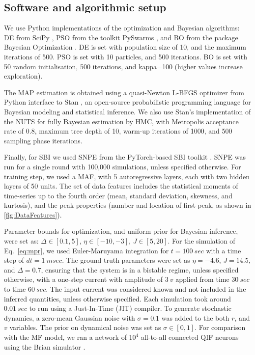 \documentclass[12pt]{article}
\begin{document}
\subsection{Software and algorithmic setup} 

We use Python implementations of the optimization and Bayesian algorithms: DE from SciPy \citep{Virtanen2020scipy}, PSO from the toolkit PySwarms \citep{Miranda2018pyswarms}, and BO from the package Bayesian Optimization \citep{Nogueira2014BO}. DE is set with population size of 10, and the maximum iterations of 500. PSO is set with 10 particles, and 500 iterations. BO is set with 50 random initialisation, 500 iterations, and kappa=100 (higher values increase exploration).

The MAP estimation is obtained using a quasi-Newton L-BFGS optimizer from Python interface to Stan \citep{Carpenter2017}, an open-source probabilistic programming language for Bayesian modeling and statistical inference. We also use Stan's implementation of the NUTS for fully Bayesian estimation by HMC, with Metropolis acceptance rate of 0.8, maximum tree depth of 10, warm-up iterations of 1000, and 500 sampling phase iterations. 

Finally, for SBI we used SNPE from the PyTorch-based SBI toolkit \citep{Tejero2020sbi}. SNPE was run for a single round with 100,000 simulations, unless specified otherwise. For training step, we used a MAF, with 5 autoregressive layers, each with two hidden layers of 50 units.
The set of data features includes the statistical moments of time-series up to the fourth order (mean, standard deviation, skewness, and kurtosis), and the peak properties (number and location of first peak, as shown in \autoref{fig:DataFeatures}).


Parameter bounds for optimization, and  uniform prior for Bayesian inference, were set as: $\Delta \in [0.1, 5]$, $\eta \in [-10, -3]$, $J \in [5, 20]$. For the simulation of Eq.~\ref{eq:mpr}, we used Euler-Maruyama integration for $t=100~sec$ with a time step of $dt=1~msec$. The ground truth parameters were set as $\eta=-4.6$, $J=14.5$, and $\Delta=0.7$, ensuring that the system is in a bistable regime, unless specified otherwise, \textcolor{black}{with} a \textcolor{black}{one-}step current with amplitude of $3~v$ \textcolor{black}{applied} from time $30~sec$ to \textcolor{black}{time} $60~sec$. \textcolor{black}{The input current was considered known and not included in the inferred quantities, unless otherwise specified.} Each simulation took around $0.01~sec$ to run using a Just-In-Time (JIT) compiler. To generate stochastic dynamics, a zero-mean Gaussian noise with $\sigma=0.1$ was added to the both $r$, and $v$ variables. The prior on dynamical noise was set as $\sigma \in [0, 1]$.
For comparison with the MF model, we ran a network of $10^4$ all-to-all connected QIF neurons using the Brian simulator \citep{Stimberg2019}.
 
\end{document}
